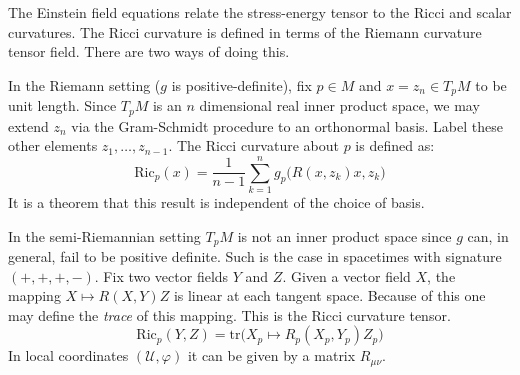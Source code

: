 \documentclass{beamer}
\begin{document}
    \begin{frame}
        The Einstein field equations relate the stress-energy tensor to the
        Ricci and scalar curvatures. The Ricci curvature is defined in terms of
        the Riemann curvature tensor field. There are two ways of doing this.
        \par\hfill\par
        In the Riemann setting ($g$ is positive-definite), fix $p\in{M}$ and
        $x=z_{n}\in{T}_{p}M$ to be unit length. Since $T_{p}M$ is an $n$
        dimensional real inner product space, we may extend $z_{n}$ via the
        Gram-Schmidt procedure to an orthonormal basis. Label these other
        elements $z_{1},\dots,z_{n-1}$. The Ricci curvature about $p$ is defined
        as:
        \begin{equation}
            \textrm{Ric}_{p}(x)=\frac{1}{n-1}\sum_{k=1}^{n}g_{p}
                \Big(R(x,z_{k})x,z_{k}\Big)
        \end{equation}
        It is a theorem that this result is independent of the choice of
        basis.
    \end{frame}
    \begin{frame}
        In the semi-Riemannian setting $T_{p}M$ is not an inner product space
        since $g$ can, in general, fail to be positive definite. Such is the
        case in spacetimes with signature $(+,+,+,-)$. Fix two vector fields
        $Y$ and $Z$. Given a vector field $X$, the mapping
        $X\mapsto{R}(X,Y)Z$ is linear at each tangent space. Because of this
        one may define the \textit{trace} of this mapping. This is the Ricci
        curvature tensor.
        \begin{equation}
            \textrm{Ric}_{p}(Y,Z)=\textrm{tr}
                \big(X_{p}\mapsto{R}_{p}(X_{p},Y_{p})Z_{p}\big)
        \end{equation}
        In local coordinates $(\mathcal{U},\varphi)$ it can be given by a
        matrix $R_{\mu\nu}$.
    \end{frame}
\end{document}
